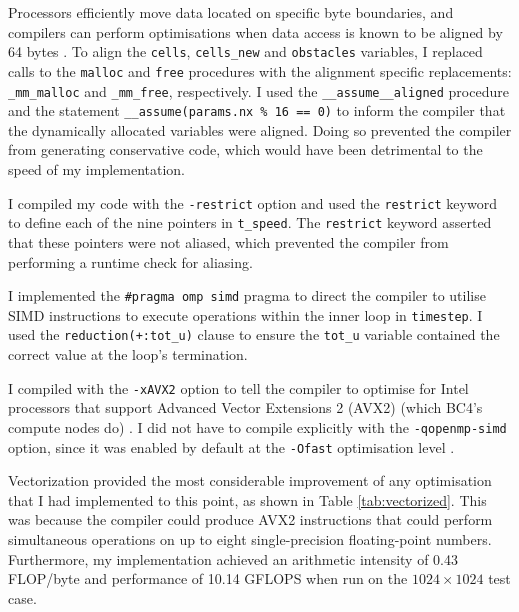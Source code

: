 \documentclass[twocolumn, a4paper]{article}
\begin{document}
Processors efficiently move data located on specific byte boundaries, and compilers can perform optimisations when data access is known to be aligned by 64 bytes \cite{alignment}.
To align the \texttt{cells}, \texttt{cells\_new} and \texttt{obstacles} variables, I replaced calls to the \texttt{malloc} and \texttt{free} procedures with the alignment specific replacements: \texttt{\_mm\_malloc} and \texttt{\_mm\_free}, respectively.
I used the \texttt{\_\_assume\_\_aligned} procedure and  the statement \texttt{\_\_assume(params.nx \% 16 == 0)} to inform the compiler that the dynamically allocated variables were aligned.
Doing so prevented the compiler from generating conservative code, which would have been detrimental to the speed of my implementation.

I compiled my code with the \texttt{-restrict} option and used the \texttt{restrict} keyword to define each of the nine pointers in \texttt{t\_speed}.
The \texttt{restrict} keyword asserted that these pointers were not aliased, which prevented the compiler from performing a runtime check for aliasing.

I implemented the \texttt{\#pragma omp simd} pragma to direct the compiler to utilise SIMD instructions to execute operations within the inner loop in \texttt{timestep}.
I used the \texttt{reduction(+:tot\_u)} clause to ensure the \texttt{tot\_u} variable contained the correct value at the loop's termination.

I compiled with the \texttt{-xAVX2} option to tell the compiler to optimise for Intel processors that support Advanced Vector Extensions 2 (AVX2) (which BC4's compute nodes do) \cite{lenovo}.
I did not have to compile explicitly with the \texttt{-qopenmp-simd} option, since it was enabled by default at the \texttt{-Ofast} optimisation level \cite{icc}.

Vectorization provided the most considerable improvement of any optimisation that I had implemented to this point, as shown in Table \ref{tab:vectorized}.
This was because the compiler could produce AVX2 instructions that could perform simultaneous operations on up to eight single-precision floating-point numbers.
Furthermore, my implementation achieved an arithmetic intensity of 0.43 FLOP/byte and performance of 10.14 GFLOPS when run on the $1024\times1024$ test case.
\end{document}
